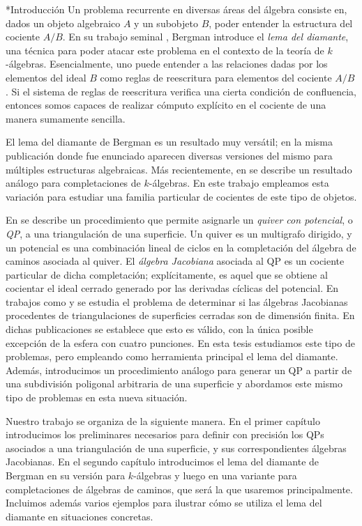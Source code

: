 \begin{chapter}*{Introducción}
Un problema recurrente en diversas áreas del álgebra consiste en, dados un objeto algebraico $A$ y un subobjeto $B$, poder entender la estructura del cociente $A/B$. En su trabajo seminal \cite{Ber78}, Bergman introduce el \emph{lema del diamante}, una técnica para poder atacar este problema en el contexto de la teoría de $k$-álgebras. Esencialmente, uno puede entender a las relaciones dadas por los elementos del ideal $B$ como reglas de reescritura para elementos del cociente $A/B$. Si el sistema de reglas de reescritura verifica una cierta condición de confluencia, entonces somos capaces de realizar cómputo explícito en el cociente de una manera sumamente sencilla.

El lema del diamante de Bergman es un resultado muy versátil; en la misma publicación donde fue enunciado aparecen diversas versiones del mismo para múltiples estructuras algebraicas. Más recientemente, en \cite{SAV15} se describe un resultado análogo para completaciones de $k$-álgebras. En este trabajo empleamos esta variación para estudiar una familia particular de cocientes de este tipo de objetos.

En \cite{DWZ08} se describe un procedimiento que permite asignarle un \emph{quiver con potencial}, o \emph{QP}, a una triangulación de una superficie. Un quiver es un multigrafo dirigido, y un potencial es una combinación lineal de ciclos en la completación del álgebra de caminos asociada al quiver. El \emph{álgebra Jacobiana} asociada al QP es un cociente particular de dicha completación; explícitamente, es aquel que se obtiene al cocientar el ideal cerrado generado por las derivadas cíclicas del potencial. En trabajos como \cite{Lad12} y \cite{TVD12} se estudia el problema de determinar si las álgebras Jacobianas procedentes de triangulaciones de superficies cerradas son de dimensión finita. En dichas publicaciones se establece que esto es válido, con la única posible excepción de la esfera con cuatro punciones. En esta tesis estudiamos este tipo de problemas, pero empleando como herramienta principal el lema del diamante. Además, introducimos un procedimiento análogo para generar un QP a partir de una subdivisión poligonal arbitraria de una superficie y abordamos este mismo tipo de problemas en esta nueva situación.

Nuestro trabajo se organiza de la siguiente manera. En el primer capítulo introducimos los preliminares necesarios para definir con precisión los QPs asociados a una triangulación de una superficie, y sus correspondientes álgebras Jacobianas. En el segundo capítulo introducimos el lema del diamante de Bergman en su versión para $k$-álgebras y luego en una variante para completaciones de álgebras de caminos, que será la que usaremos principalmente. Incluimos además varios ejemplos para ilustrar cómo se utiliza el lema del diamante en situaciones concretas.


\end{chapter}
